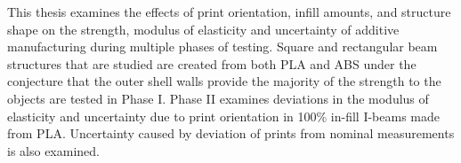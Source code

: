 This thesis examines the effects of print orientation, infill amounts, and structure shape on the strength, modulus of elasticity and uncertainty of additive manufacturing during multiple phases of testing. Square and rectangular beam structures that are studied are created from both PLA and ABS under the conjecture that the outer shell walls provide the majority of the strength to the objects are tested in Phase I. Phase II examines deviations in the modulus of elasticity and uncertainty due to print orientation in 100\% in-fill I-beams made from PLA. Uncertainty caused by deviation of prints from nominal measurements is also examined.